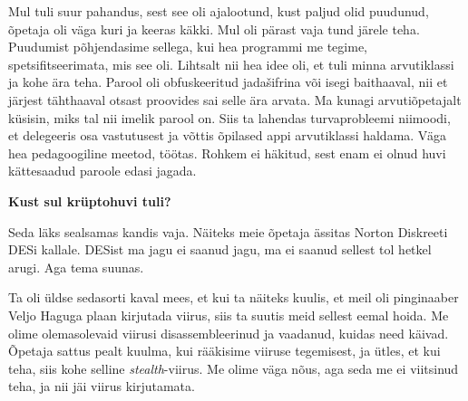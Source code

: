 Mul tuli suur pahandus, sest see oli ajalootund, kust
paljud olid puudunud, õpetaja oli väga kuri ja keeras käkki. Mul oli
pärast vaja tund järele teha. Puudumist põhjendasime sellega, kui 
hea programmi me tegime, spetsifitseerimata, mis see oli. Lihtsalt nii hea idee oli, et
tuli minna arvutiklassi ja kohe ära teha. Parool oli obfuskeeritud
jadašifrina või isegi baithaaval, nii et järjest tähthaaval otsast proovides
sai selle ära arvata. Ma kunagi arvutiõpetajalt küsisin, miks
tal nii imelik parool on. Siis ta lahendas turvaprobleemi niimoodi, et
delegeeris osa vastutusest ja võttis õpilased appi arvutiklassi
haldama. Väga hea pedagoogiline meetod, töötas. Rohkem ei häkitud, sest enam ei olnud 
huvi kättesaadud paroole edasi jagada.

\textbf{Kust sul krüptohuvi tuli?}

Seda läks sealsamas kandis vaja. Näiteks meie õpetaja ässitas Norton
Diskreeti
DESi kallale. DESist
ma jagu ei saanud jagu, ma ei saanud sellest tol hetkel arugi. Aga tema suunas. 

Ta oli üldse sedasorti kaval mees, et kui ta näiteks kuulis, et meil oli
pinginaaber Veljo Haguga plaan kirjutada viirus,
siis ta suutis meid sellest eemal hoida. Me olime olemasolevaid viirusi
disassembleerinud ja vaadanud, kuidas need käivad. Õpetaja sattus pealt kuulma,
kui rääkisime viiruse tegemisest, ja ütles, et kui teha, siis kohe
selline \emph{stealth}-viirus. Me olime väga nõus, aga seda me ei viitsinud
teha, ja nii jäi viirus kirjutamata.

